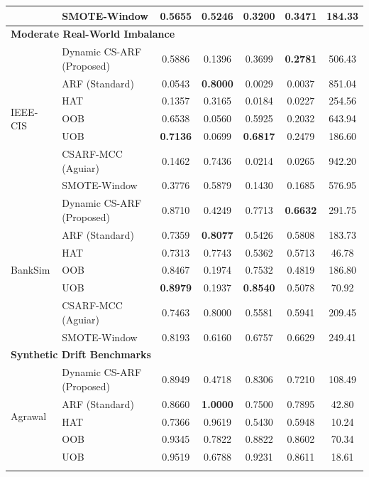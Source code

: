 \begin{longtable}{|l|l|c|c|c|c|c|}
 & SMOTE-Window & 0.5655 & 0.5246 & 0.3200 & \textbf{0.3471} & 184.33 \\ \hline
\multicolumn{7}{|l|}{\textbf{Moderate Real-World Imbalance}} \\ \hline
\multirow{7}{*}{IEEE-CIS} & Dynamic CS-ARF (Proposed) & 0.5886 & 0.1396 & 0.3699 & \textbf{0.2781} & 506.43 \\ \cline{2-7}
 & ARF (Standard) & 0.0543 & \textbf{0.8000} & 0.0029 & 0.0037 & 851.04 \\ \cline{2-7}
 & HAT & 0.1357 & 0.3165 & 0.0184 & 0.0227 & 254.56 \\ \cline{2-7}
 & OOB & 0.6538 & 0.0560 & 0.5925 & 0.2032 & 643.94 \\ \cline{2-7}
 & UOB & \textbf{0.7136} & 0.0699 & \textbf{0.6817} & 0.2479 & 186.60 \\ \cline{2-7}
 & CSARF-MCC (Aguiar) & 0.1462 & 0.7436 & 0.0214 & 0.0265 & 942.20 \\ \cline{2-7}
 & SMOTE-Window & 0.3776 & 0.5879 & 0.1430 & 0.1685 & 576.95 \\ \hline
\multirow{7}{*}{BankSim} & Dynamic CS-ARF (Proposed) & 0.8710 & 0.4249 & 0.7713 & \textbf{0.6632} & 291.75 \\ \cline{2-7}
 & ARF (Standard) & 0.7359 & \textbf{0.8077} & 0.5426 & 0.5808 & 183.73 \\ \cline{2-7}
 & HAT & 0.7313 & 0.7743 & 0.5362 & 0.5713 & 46.78 \\ \cline{2-7}
 & OOB & 0.8467 & 0.1974 & 0.7532 & 0.4819 & 186.80 \\ \cline{2-7}
 & UOB & \textbf{0.8979} & 0.1937 & \textbf{0.8540} & 0.5078 & 70.92 \\ \cline{2-7}
 & CSARF-MCC (Aguiar) & 0.7463 & 0.8000 & 0.5581 & 0.5941 & 209.45 \\ \cline{2-7}
 & SMOTE-Window & 0.8193 & 0.6160 & 0.6757 & 0.6629 & 249.41 \\ \hline
\multicolumn{7}{|l|}{\textbf{Synthetic Drift Benchmarks}} \\ \hline
\multirow{7}{*}{Agrawal} & Dynamic CS-ARF (Proposed) & 0.8949 & 0.4718 & 0.8306 & 0.7210 & 108.49 \\ \cline{2-7}
 & ARF (Standard) & 0.8660 & \textbf{1.0000} & 0.7500 & 0.7895 & 42.80 \\ \cline{2-7}
 & HAT & 0.7366 & 0.9619 & 0.5430 & 0.5948 & 10.24 \\ \cline{2-7}
 & OOB & 0.9345 & 0.7822 & 0.8822 & 0.8602 & 70.34 \\ \cline{2-7}
 & UOB & 0.9519 & 0.6788 & 0.9231 & 0.8611 & 18.61 \\ \cline{2-7}

\end{longtable}
